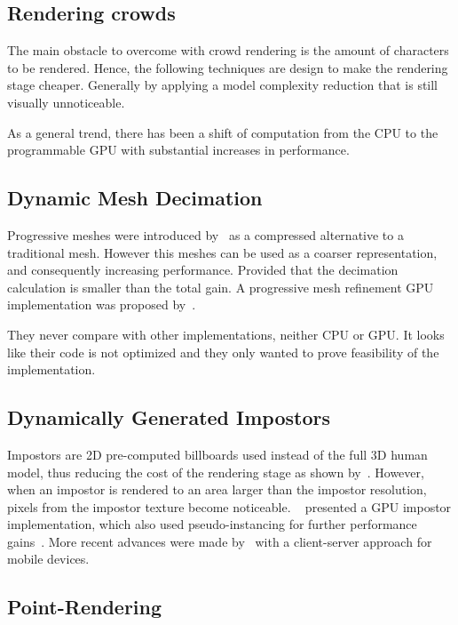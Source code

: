 \documentclass[11pt]{article}
\begin{document}
\begin{multicols}{2}
\section{Rendering crowds}

The main obstacle to overcome with crowd rendering is the amount of characters to be rendered.
Hence, the following techniques are design to make the rendering stage cheaper.
Generally by applying a model complexity reduction that is still visually unnoticeable.

As a general trend, there has been a shift of computation from the CPU to the programmable GPU with substantial increases in performance.

\subsection{Dynamic Mesh Decimation}

Progressive meshes were introduced by~\cite{Hoppe1996} as a compressed alternative to a traditional mesh.
However this meshes can be used as a coarser representation, and consequently increasing performance.
Provided that the decimation calculation is smaller than the total gain.
A progressive mesh refinement GPU implementation was proposed by~\cite{Hu2009}.

They never compare with other implementations, neither CPU or GPU.
It looks like their code is not optimized and they only wanted to prove feasibility of the implementation. 

\subsection{Dynamically Generated Impostors}
\label{subsec:DimGenImpostors}

Impostors are 2D pre-computed billboards used instead of the full 3D human model, thus reducing the cost of the rendering stage as shown by~\cite{Aubel2000}.
However, when an impostor is rendered to an area larger than the impostor resolution, pixels from the impostor texture become noticeable.
~\cite{Millan2006} presented a GPU impostor implementation, which also used pseudo-instancing for further performance gains~\cite{zelsnack2004glsl}.
More recent advances were made by~\cite{Ghiletiuc2013} with a client-server approach for mobile devices.

\subsection{Point-Rendering}


\end{multicols}
\end{document}

